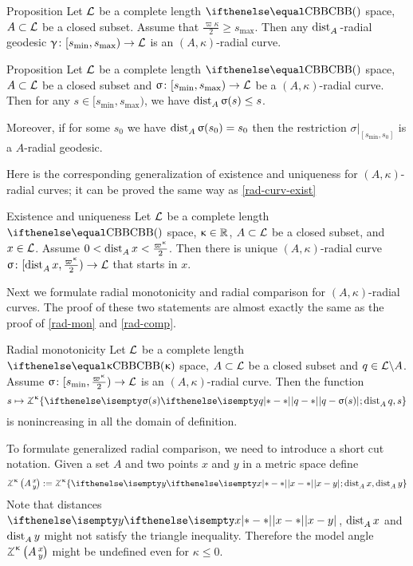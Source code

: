 \begin{thm}{Proposition}
Let $\mathcal{L}$ be a complete length $\Alex{}$ space,
$A\subset\spc{L}$ be a closed subset.
Assume that 
$\tfrac{\varpi\kappa}{2}
\ge 
s_{\max}$.
Then any $\mathop{\rm dist}\nolimits_{A}^{{}}{}{}$-radial geodesic 
$\gamma\:[s_{\min},s_{\max})
\to 
\spc{L}$ 
is an $(A,\kappa)$-radial curve.
\end{thm}

\begin{thm}{Proposition}
Let $\mathcal{L}$ be a complete length $\Alex{}$ space,
$A\subset\spc{L}$ be a closed subset 
and $\sigma\:[s_{\min},s_{\max})\to \spc{L}$ be a $(A,\kappa)$-radial curve.
Then for any $s\in [s_{\min},s_{\max})$, 
we have $\distfun{A}{\sigma(s)}{}\le s$.

Moreover, if for some $s_0$ we have $\mathop{\rm dist}\nolimits_{A}^{{}}{\upsigma(s_0)}{}= s_0$ 
then the restriction $\sigma|_{[s_{\min},s_0]}$ is a $A$-radial geodesic.
\end{thm}

Here is the corresponding generalization of existence and uniqueness 
for $(A,\kappa)$-radial curves;
it can be proved the same way as \ref{rad-curv-exist}

\begin{thm}{Existence and uniqueness}
Let $\mathcal{L}$ be a complete length $\Alex{}$ space, 
$\kappa\in\RR$, 
$A\subset\spc{L}$ be a closed subset, 
and $x\in \spc{L}$.
Assume
$0
<
\distfun{A}{x}{}
\z<
\tfrac{\varpi\kappa}2$.
Then there is unique $(A,\kappa)$-radial curve $\sigma\:[\distfun{A}{x}{},\tfrac{\varpi\kappa}2)\to \spc{L}$ 
that starts in $x$.
\end{thm}

Next we formulate radial monotonicity and radial comparison for $(A,\kappa)$-radial curves.
The proof of these two statements are almost exactly the same as the proof of \ref{rad-mon} and \ref{rad-comp}.

\begin{thm}{Radial monotonicity}\label{gen-rad-mon}
Let $\mathcal{L}$ be a complete length $\Alex{\kappa}$ space,
$A\subset \spc{L}$ be a closed subset
and $q\in\spc{L}\backslash A$.
Assume $\sigma\:  [s_{\min},\tfrac{\varpi\kappa}2)\to \spc{L}$
is an $(A,\kappa)$-radial curve.
Then the function 
\[s\mapsto 
\tangle\mc\kappa\{
\dist{q}{\sigma(s)}{};
\distfun{A}{q}{},
s
\}\]
is nonincreasing in all the domain of definition.
\end{thm}

To formulate generalized radial comparison,
we need to introduce a short cut notation.
Given a set $A$ and two points $x$ and $y$ in a metric space define
\[
\angkk\kappa A{x}{y}
\df
\tangle\mc\kappa\{
\dist{x}{y}{};
\distfun{A}{x}{},
\distfun{A}{y}{}
\}
\]
Note that distances $\dist{x}{y}{}$, 
$\mathop{\rm dist}\nolimits_{A}^{{}}{x}{}$ and 
$\mathop{\rm dist}\nolimits_{A}^{{}}{y}{}$ might not satisfy the triangle inequality.
Therefore the model angle 
$\angkk\kappa A{x}{y}$ might be undefined even for $\kappa\le0$.

